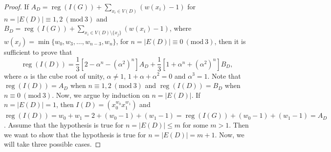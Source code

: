 \documentclass[11pt,reqno]{amsart}
\newcommand{\reg}{\operatorname{reg}}
\theoremstyle{definition}
\begin{document}
\begin{proof}
If $A_D=  \reg(I(G)) + \displaystyle{  \displaystyle{ \sum_{x_i \in V(D)}}(w(x_i) - 1) }  $ for $  n=|E(D)|\equiv 1,2~(\mbox{mod}~3)  $ and $B_D=\reg(I(G)) + \displaystyle{  \displaystyle{ \sum_{x_i \in V(D)\setminus\{x_j\}}}(w(x_i) - 1) }$, where  $w(x_j) = \min\{w_0,w_3,\ldots,w_{n-3},w_{n}\}$, for $  n=|E(D)|\equiv 0~(\mbox{mod}~3)  $, then it is sufficient  to prove that
 $$\reg(I(D)) =   \frac{1}{3}[2 -\alpha^{n} -(\alpha^2)^{n}]A_D  + \frac{1}{3}[1 +\alpha^n + (\alpha^2)^n]B_D,$$ where $\alpha$ is the cube root of unity, $\alpha \neq 1$, $1+\alpha + \alpha^2 = 0$ and $\alpha^3 = 1$.
Note that  $\reg(I(D)) = A_D  $  when  $  n\equiv 1,2~(\mbox{mod}~3)  $  and $\reg(I(D)) = B_D  $  when  $  n\equiv 0~(\mbox{mod}~3)  $. Now, we argue by induction on $n = |E(D)|$. If $n=|E(D)| =  1$, then $I(D) = (x_0^{w_0}x_1^{w_1})$ and $\reg(I(D)) = w_0+w_1 = 2 + (w_0-1) + (w_1-1)  =  \reg(I(G)) + (w_0-1) + (w_1-1)=A_D$. Assume that the hypothesis is true for $n=|E(D)| \leq m$ for some $m > 1$. Then we want to show that the hypothesis is true for $n=|E(D)| = m+1.$ Now, we will take three possible cases.       
 

\end{proof}
\end{document}
